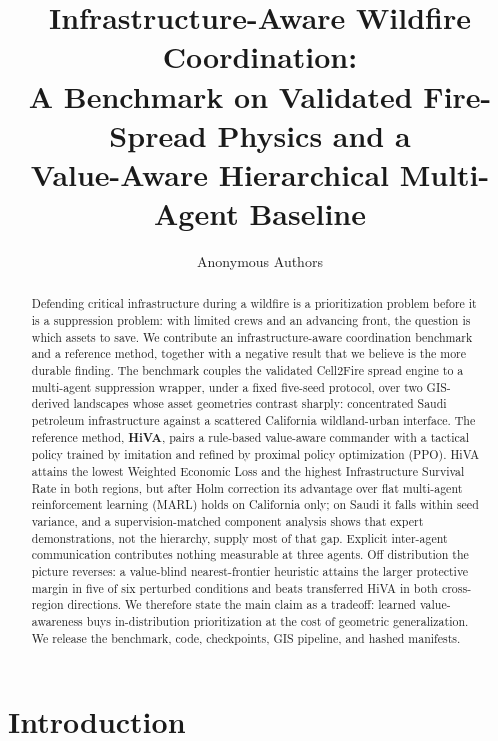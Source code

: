 \documentclass[letterpaper]{article}
\title{Infrastructure-Aware Wildfire Coordination: \\ A Benchmark on Validated Fire-Spread Physics and a \\ Value-Aware Hierarchical Multi-Agent Baseline}
\author{Anonymous Authors}
\begin{document}
\maketitle

\begin{abstract}
Defending critical infrastructure during a wildfire is a prioritization problem before it is a suppression problem: with limited crews and an advancing front, the question is which assets to save. We contribute an infrastructure-aware coordination benchmark and a reference method, together with a negative result that we believe is the more durable finding. The benchmark couples the validated Cell2Fire spread engine to a multi-agent suppression wrapper, under a fixed five-seed protocol, over two GIS-derived landscapes whose asset geometries contrast sharply: concentrated Saudi petroleum infrastructure against a scattered California wildland-urban interface. The reference method, \textbf{HiVA}, pairs a rule-based value-aware commander with a tactical policy trained by imitation and refined by proximal policy optimization (PPO). HiVA attains the lowest Weighted Economic Loss and the highest Infrastructure Survival Rate in both regions, but after Holm correction its advantage over flat multi-agent reinforcement learning (MARL) holds on California only; on Saudi it falls within seed variance, and a supervision-matched component analysis shows that expert demonstrations, not the hierarchy, supply most of that gap. Explicit inter-agent communication contributes nothing measurable at three agents. Off distribution the picture reverses: a value-blind nearest-frontier heuristic attains the larger protective margin in five of six perturbed conditions and beats transferred HiVA in both cross-region directions. We therefore state the main claim as a tradeoff: learned value-awareness buys in-distribution prioritization at the cost of geometric generalization. We release the benchmark, code, checkpoints, GIS pipeline, and hashed manifests.
\end{abstract}

\section{Introduction}
\label{sec:intro}
\end{document}
